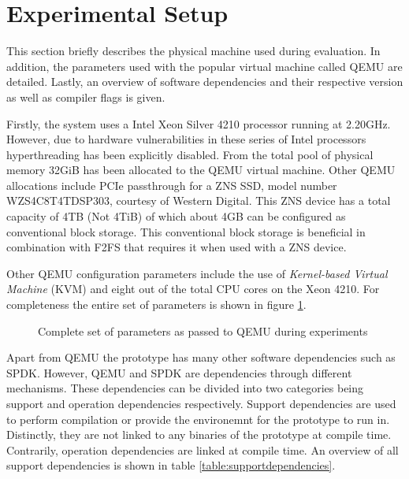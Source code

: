 \section{Experimental Setup}

This section briefly describes the physical machine used during evaluation.
In addition, the parameters used with the popular virtual machine called QEMU
\cite{qemu} are detailed. Lastly, an overview of software dependencies and their
respective version as well as compiler flags is given.

Firstly, the system uses a Intel Xeon Silver 4210 processor running at 2.20GHz.
However, due to hardware vulnerabilities in these series of Intel processors
hyperthreading has been explicitly disabled. From the total pool of physical
memory 32GiB has been allocated to the QEMU virtual machine. Other QEMU
allocations include PCIe passthrough for a ZNS SSD, model number
WZS4C8T4TDSP303, courtesy of Western Digital. This ZNS device has a total
capacity of 4TB (Not 4TiB) of which about 4GB can be configured as conventional
block storage. This conventional block storage is beneficial in combination with
F2FS that requires it when used with a ZNS device.

Other QEMU configuration parameters include the use of
\textit{Kernel-based Virtual Machine} (KVM) \cite{kvm} and eight out of the
total CPU cores on the Xeon 4210. For completeness the entire set of parameters
is shown in figure \ref{figure:qemuparameters}.

\begin{figure}
    \centering
	\caption{Complete set of parameters as passed to QEMU during experiments}
    \label{figure:qemuparameters}
\end{figure}

Apart from QEMU the prototype has many other software dependencies such as SPDK.
However, QEMU and SPDK are dependencies through different mechanisms. These
dependencies can be divided into two categories being support and operation
dependencies respectively. Support dependencies are used to perform compilation
or provide the environemnt for the prototype to run in. Distinctly, they are not
linked to any binaries of the prototype at compile time. Contrarily, operation
dependencies are linked at compile time. An overview of all support dependencies
is shown in table \ref{table:supportdependencies}.


